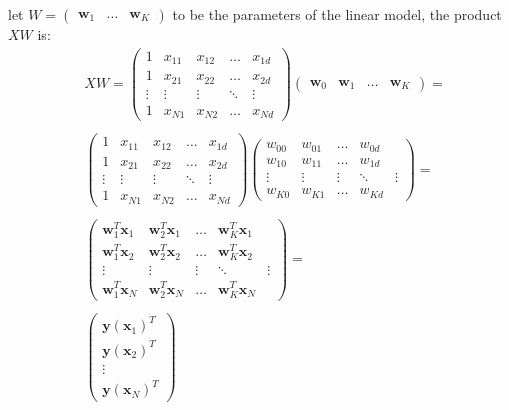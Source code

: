 \documentclass[10pt, letterpaper]{report}
\begin{document}
let $W=\begin{pmatrix}
		\mathbf w_1 & \dots & \mathbf w_K
	\end{pmatrix}$ to be the parameters of the linear model, the product $XW$ is: \begin{align}
	 & XW = \begin{pmatrix}
		        1      & x_{11} & x_{12} & \dots  & x_{1d} \\
		        1      & x_{21} & x_{22} & \dots  & x_{2d} \\
		        \vdots & \vdots & \vdots & \ddots & \vdots \\
		        1      & x_{N1} & x_{N2} & \dots  & x_{Nd}
	        \end{pmatrix}\begin{pmatrix}
		                     \mathbf w_0 & \mathbf w_1 & \dots & \mathbf w_K
	                     \end{pmatrix}=                                \\ \\
	 & \begin{pmatrix}
		   1      & x_{11} & x_{12} & \dots  & x_{1d} \\
		   1      & x_{21} & x_{22} & \dots  & x_{2d} \\
		   \vdots & \vdots & \vdots & \ddots & \vdots \\
		   1      & x_{N1} & x_{N2} & \dots  & x_{Nd}
	   \end{pmatrix}
	\begin{pmatrix}
		w_{00} & w_{01} & \dots  & w_{0d}          \\
		w_{10} & w_{11} & \dots  & w_{1d}          \\
		\vdots & \vdots & \vdots & \ddots & \vdots \\
		w_{K0} & w_{K1} & \dots  & w_{Kd}
	\end{pmatrix}=                                                          \\  \\
	 & \begin{pmatrix}
		   \mathbf w^T_1\mathbf x_1 & \mathbf w^T_2\mathbf x_1 & \dots  & \mathbf w^T_K\mathbf x_1          \\
		   \mathbf w^T_1\mathbf x_2 & \mathbf w^T_2\mathbf x_2 & \dots  & \mathbf w^T_K\mathbf x_2          \\
		   \vdots                   & \vdots                   & \vdots & \ddots                   & \vdots \\
		   \mathbf w^T_1\mathbf x_N & \mathbf w^T_2\mathbf x_N & \dots  & \mathbf w^T_K\mathbf x_N
	   \end{pmatrix} = \\ \\ &\begin{pmatrix}
		\mathbf y(\mathbf x_1)^T \\
		\mathbf y(\mathbf x_2)^T \\
		\vdots                   \\
		\mathbf y(\mathbf x_N)^T
	\end{pmatrix}
\end{align}
\end{document}
